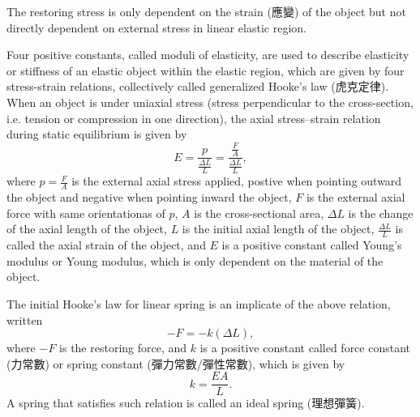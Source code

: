 \documentclass[a4paper,12pt]{article}
\begin{document}
The restoring stress is only dependent on the strain (應變) of the object but not directly dependent on external stress in linear elastic region.

Four positive constants, called moduli of elasticity, are used to describe elasticity or stiffness of an elastic object within the elastic region, which are given by four stress-strain relations, collectively called generalized Hooke's law (虎克定律).
When an object is under uniaxial stress (stress perpendicular to the cross-section, i.e. tension or compression in one direction), the axial stress–strain relation during static equilibrium is given by
\[E=\frac{p}{\frac{\Delta L}{L}}=\frac{\frac{F}{A}}{\frac{\Delta L}{L}},\]
where $p=\frac{F}{A}$ is the external axial stress applied, postive when pointing outward the object and negative when pointing inward the object, $F$ is the external axial force with same orientationas of $p$, $A$ is the cross-sectional area, $\Delta L$ is the change of the axial length of the object, $L$ is the initial axial length of the object, $\frac{\Delta L}{L}$ is called the axial strain of the object, and $E$ is a positive constant called Young's modulus or Young modulus, which is only dependent on the material of the object.

The initial Hooke's law for linear spring is an implicate of the above relation, written
\[-F=-k(\Delta L),\]
where $-F$ is the restoring force, and $k$ is a positive constant called force constant (力常數) or spring constant (彈力常數/彈性常數), which is given by
\[k=\frac{EA}{L}.\]
A spring that satisfies such relation is called an ideal spring (理想彈簧).
\end{document}
